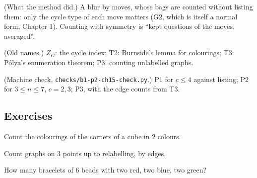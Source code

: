 \begin{lines}
\item[\lab{R1}] (What the method did.) A blur by moves, whose bags are counted without listing them: only the cycle type of each move matters (G2, which is itself a normal form, Chapter 1). Counting with symmetry is ``kept questions of the moves, averaged''.
\item[\lab{R2}] (Old names.) $Z_G$: the cycle index; T2: Burnside's lemma for colourings; T3: P\'olya's enumeration theorem; P3: counting unlabelled graphs.
\item[\lab{R3}] (Machine check, \texttt{checks/b1-p2-ch15-check.py}.) P1 for $c \le 4$ against listing; P2 for $3 \le n \le 7$, $c = 2, 3$; P3, with the edge counts from T3.
\end{lines}

\subsection*{Exercises}

\begin{lines}
\item[\lab{E1}] Count the colourings of the corners of a cube in $2$ colours.
\item[\lab{E2}] Count graphs on $3$ points up to relabelling, by edges.
\item[\lab{E3}] How many bracelets of $6$ beads with two red, two blue, two green?
\end{lines}
